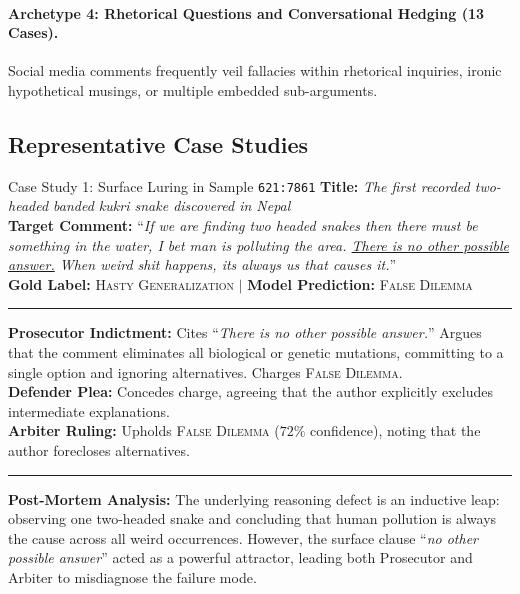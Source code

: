 \documentclass[11pt]{article}
\begin{document}
\paragraph{Archetype 4: Rhetorical Questions and Conversational Hedging (13 Cases).}
Social media comments frequently veil fallacies within rhetorical inquiries, ironic hypothetical musings, or multiple embedded sub-arguments.

\subsection{Representative Case Studies}

\begin{dialoguebox}{Case Study 1: Surface Luring in Sample \texttt{621:7861}}
\textbf{Title:} \textit{The first recorded two-headed banded kukri snake discovered in Nepal} \\
\textbf{Target Comment:} ``\textit{If we are finding two headed snakes then there must be something in the water, I bet man is polluting the area. \underline{There is no other possible answer.} When weird shit happens, its always us that causes it.}'' \\
\textbf{Gold Label:} \textsc{Hasty Generalization} $\mid$ \textbf{Model Prediction:} \textsc{False Dilemma}

\vspace{1mm}\hrule\vspace{1mm}
\textbf{Prosecutor Indictment:} Cites ``\textit{There is no other possible answer.}'' Argues that the comment eliminates all biological or genetic mutations, committing to a single option and ignoring alternatives. Charges \textsc{False Dilemma}. \\
\textbf{Defender Plea:} Concedes charge, agreeing that the author explicitly excludes intermediate explanations. \\
\textbf{Arbiter Ruling:} Upholds \textsc{False Dilemma} ($72\%$ confidence), noting that the author forecloses alternatives.

\vspace{1mm}\hrule\vspace{1mm}
\textbf{Post-Mortem Analysis:} The underlying reasoning defect is an inductive leap: observing one two-headed snake and concluding that human pollution is always the cause across all weird occurrences. However, the surface clause ``\textit{no other possible answer}'' acted as a powerful attractor, leading both Prosecutor and Arbiter to misdiagnose the failure mode.
\end{dialoguebox}
\end{document}
